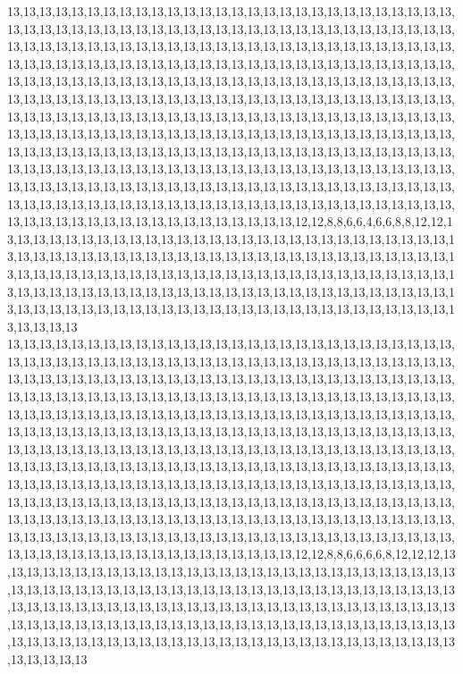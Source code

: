 13,13,13,13,13,13,13,13,13,13,13,13,13,13,13,13,13,13,13,13,13,13,13,13,13,13,13,13,13,13,13,13,13,13,13,13,13,13,13,13,13,13,13,13,13,13,13,13,13,13,13,13,13,13,13,13,13,13,13,13,13,13,13,13,13,13,13,13,13,13,13,13,13,13,13,13,13,13,13,13,13,13,13,13,13,13,13,13,13,13,13,13,13,13,13,13,13,13,13,13,13,13,13,13,13,13,13,13,13,13,13,13,13,13,13,13,13,13,13,13,13,13,13,13,13,13,13,13,13,13,13,13,13,13,13,13,13,13,13,13,13,13,13,13,13,13,13,13,13,13,13,13,13,13,13,13,13,13,13,13,13,13,13,13,13,13,13,13,13,13,13,13,13,13,13,13,13,13,13,13,13,13,13,13,13,13,13,13,13,13,13,13,13,13,13,13,13,13,13,13,13,13,13,13,13,13,13,13,13,13,13,13,13,13,13,13,13,13,13,13,13,13,13,13,13,13,13,13,13,13,13,13,13,13,13,13,13,13,13,13,13,13,13,13,13,13,13,13,13,13,13,13,13,13,13,13,13,13,13,13,13,13,13,13,13,13,13,13,13,13,13,13,13,13,13,13,13,13,13,13,13,13,13,13,13,13,13,13,13,13,13,13,13,13,13,13,13,13,13,13,13,13,13,13,13,13,13,13,13,13,13,13,13,13,13,13,13,13,13,13,13,13,13,13,13,13,13,13,13,13,13,13,13,13,13,13,13,13,13,13,13,13,13,13,13,13,13,13,13,13,13,13,13,13,12,12,8,8,6,6,4,6,6,8,8,12,12,13,13,13,13,13,13,13,13,13,13,13,13,13,13,13,13,13,13,13,13,13,13,13,13,13,13,13,13,13,13,13,13,13,13,13,13,13,13,13,13,13,13,13,13,13,13,13,13,13,13,13,13,13,13,13,13,13,13,13,13,13,13,13,13,13,13,13,13,13,13,13,13,13,13,13,13,13,13,13,13,13,13,13,13,13,13,13,13,13,13,13,13,13,13,13,13,13,13,13,13,13,13,13,13,13,13,13,13,13,13,13,13,13,13,13,13,13,13,13,13,13,13,13,13,13,13,13,13,13,13,13,13,13,13,13,13,13,13,13,13,13,13,13,13,13
13,13,13,13,13,13,13,13,13,13,13,13,13,13,13,13,13,13,13,13,13,13,13,13,13,13,13,13,13,13,13,13,13,13,13,13,13,13,13,13,13,13,13,13,13,13,13,13,13,13,13,13,13,13,13,13,13,13,13,13,13,13,13,13,13,13,13,13,13,13,13,13,13,13,13,13,13,13,13,13,13,13,13,13,13,13,13,13,13,13,13,13,13,13,13,13,13,13,13,13,13,13,13,13,13,13,13,13,13,13,13,13,13,13,13,13,13,13,13,13,13,13,13,13,13,13,13,13,13,13,13,13,13,13,13,13,13,13,13,13,13,13,13,13,13,13,13,13,13,13,13,13,13,13,13,13,13,13,13,13,13,13,13,13,13,13,13,13,13,13,13,13,13,13,13,13,13,13,13,13,13,13,13,13,13,13,13,13,13,13,13,13,13,13,13,13,13,13,13,13,13,13,13,13,13,13,13,13,13,13,13,13,13,13,13,13,13,13,13,13,13,13,13,13,13,13,13,13,13,13,13,13,13,13,13,13,13,13,13,13,13,13,13,13,13,13,13,13,13,13,13,13,13,13,13,13,13,13,13,13,13,13,13,13,13,13,13,13,13,13,13,13,13,13,13,13,13,13,13,13,13,13,13,13,13,13,13,13,13,13,13,13,13,13,13,13,13,13,13,13,13,13,13,13,13,13,13,13,13,13,13,13,13,13,13,13,13,13,13,13,13,13,13,13,13,13,13,13,13,13,13,13,13,13,13,13,13,13,13,13,13,13,13,13,13,13,13,13,13,13,13,13,13,13,12,12,8,8,6,6,6,6,8,12,12,12,13,13,13,13,13,13,13,13,13,13,13,13,13,13,13,13,13,13,13,13,13,13,13,13,13,13,13,13,13,13,13,13,13,13,13,13,13,13,13,13,13,13,13,13,13,13,13,13,13,13,13,13,13,13,13,13,13,13,13,13,13,13,13,13,13,13,13,13,13,13,13,13,13,13,13,13,13,13,13,13,13,13,13,13,13,13,13,13,13,13,13,13,13,13,13,13,13,13,13,13,13,13,13,13,13,13,13,13,13,13,13,13,13,13,13,13,13,13,13,13,13,13,13,13,13,13,13,13,13,13,13,13,13,13,13,13,13,13,13,13,13,13,13,13,13,13
